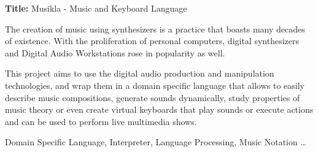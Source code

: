 \textbf{Title:} Musikla - Music and Keyboard Language

\bigskip

The creation of music using synthesizers is a practice that boasts many decades of existence. With the proliferation of personal computers, digital synthesizers and Digital Audio Workstations rose in popularity as well.

This project aims to use the digital audio production and manipulation technologies, and wrap them in a domain specific language that allows to easily describe music compositions, generate sounds dynamically, study properties of music theory or even create virtual keyboards that play sounds or execute actions and can be used to perform live multimedia shows.
\begin{keywords}
Domain Specific Language, Interpreter, Language Processing, Music Notation \ldots
\end{keywords} 
